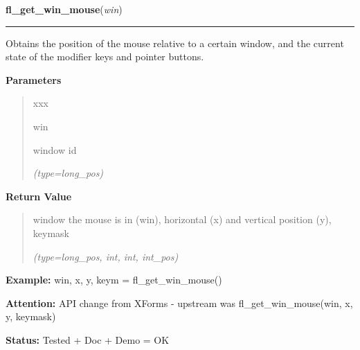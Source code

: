 \hspace{.8\funcindent}\begin{boxedminipage}{\funcwidth}

    \raggedright \textbf{fl\_get\_win\_mouse}(\textit{win})

    \vspace{-1.5ex}

    \rule{\textwidth}{0.5\fboxrule}
\setlength{\parskip}{2ex}
    Obtains the position of the mouse relative to a certain window, and the
    current state of the modifier keys and pointer buttons.

\setlength{\parskip}{1ex}
      \textbf{Parameters}
      \vspace{-1ex}

      \begin{quote}
        \begin{Ventry}{xxx}

          \item[win]

          window id

            {\it (type=long\_pos)}

        \end{Ventry}

      \end{quote}

      \textbf{Return Value}
    \vspace{-1ex}

      \begin{quote}
      window the mouse is in (win), horizontal (x) and vertical position 
      (y), keymask

      {\it (type=long\_pos, int, int, int\_pos)}

      \end{quote}

\textbf{Example:} win, x, y, keym = fl\_get\_win\_mouse()



\textbf{Attention:} API change from XForms - upstream was fl\_get\_win\_mouse(win, x, y, 
keymask)



\textbf{Status:} Tested + Doc + Demo = OK



    \end{boxedminipage}

    \label{xformslib:flxbasic:fl_get_form_mouse}

